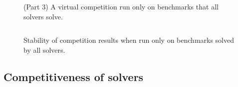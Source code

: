 \documentclass{eptcs}
\begin{document}
\begin{figure}
\centering
\begin{tabular}{|p{.01in}rrrl|}
\hline

\end{tabular}
\caption{(Part 3) A virtual competition run only on benchmarks that all solvers solve.}
\label{Fig:virtual-competition-solved3}
\end{figure}


\begin{figure}
\centering
\begin{tabular}{|lrr|rr|}
\hline

\end{tabular}
\caption{Stability of competition results when run only on benchmarks solved by all solvers.}
\label{Fig:virtual-competition-solved-some}
\end{figure}

\subsection{Competitiveness of solvers}
\label{Competitiveness}
\end{document}
